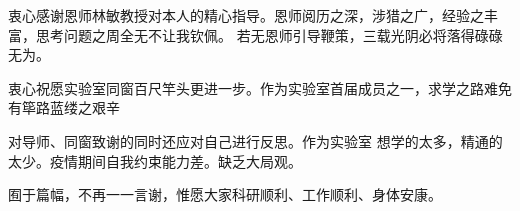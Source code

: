 \begin{acknowledgement}
    衷心感谢恩师林敏教授对本人的精心指导。恩师阅历之深，涉猎之广，经验之丰富，思考问题之周全无不让我钦佩。
    若无恩师引导鞭策，三载光阴必将落得碌碌无为。

    衷心祝愿实验室同窗百尺竿头更进一步。作为实验室首届成员之一，求学之路难免有筚路蓝缕之艰辛

    对导师、同窗致谢的同时还应对自己进行反思。作为实验室 想学的太多，精通的太少。疫情期间自我约束能力差。缺乏大局观。

    囿于篇幅，不再一一言谢，惟愿大家科研顺利、工作顺利、身体安康。
\end{acknowledgement}
